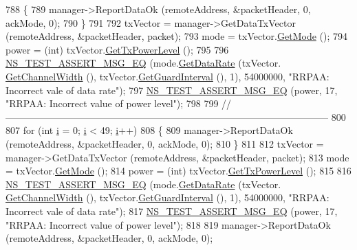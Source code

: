\begin{DoxyCode}
788     \{
789       manager->ReportDataOk (remoteAddress, &packetHeader, 0, ackMode, 0);
790     \}
791 
792   txVector = manager->GetDataTxVector (remoteAddress, &packetHeader, packet);
793   mode = txVector.\hyperlink{classns3_1_1WifiTxVector_a497b1f11cad4b8b26251dfa07c9ad1d6}{GetMode} ();
794   power = (int) txVector.\hyperlink{classns3_1_1WifiTxVector_a7c98bd9609ff1c5cefa6e22d6908a2fe}{GetTxPowerLevel} ();
795 
796   \hyperlink{group__testing_ga2a9d78cffb3db8e867c35fff0b698cf5}{NS\_TEST\_ASSERT\_MSG\_EQ} (mode.\hyperlink{classns3_1_1WifiMode_adcfbe150f69da720db23387f733b8a52}{GetDataRate} (txVector.
      \hyperlink{classns3_1_1WifiTxVector_a1f8bfa51778a3e217581eb665f059564}{GetChannelWidth} (), txVector.\hyperlink{classns3_1_1WifiTxVector_ab80c0fd812542ef337a6cace4f64db63}{GetGuardInterval} (), 1), 54000000, \textcolor{stringliteral}{"RRPAA:
       Incorrect vale of data rate"});
797   \hyperlink{group__testing_ga2a9d78cffb3db8e867c35fff0b698cf5}{NS\_TEST\_ASSERT\_MSG\_EQ} (power, 17, \textcolor{stringliteral}{"RRPAA: Incorrect value of power level"});
798 
799   \textcolor{comment}{//-----------------------------------------------------------------------------------------------------}
800 
807   \textcolor{keywordflow}{for} (\textcolor{keywordtype}{int} \hyperlink{bernuolliDistribution_8m_a6f6ccfcf58b31cb6412107d9d5281426}{i} = 0; \hyperlink{bernuolliDistribution_8m_a6f6ccfcf58b31cb6412107d9d5281426}{i} < 49; \hyperlink{bernuolliDistribution_8m_a6f6ccfcf58b31cb6412107d9d5281426}{i}++)
808     \{
809       manager->ReportDataOk (remoteAddress, &packetHeader, 0, ackMode, 0);
810     \}
811 
812   txVector = manager->GetDataTxVector (remoteAddress, &packetHeader, packet);
813   mode = txVector.\hyperlink{classns3_1_1WifiTxVector_a497b1f11cad4b8b26251dfa07c9ad1d6}{GetMode} ();
814   power = (int) txVector.\hyperlink{classns3_1_1WifiTxVector_a7c98bd9609ff1c5cefa6e22d6908a2fe}{GetTxPowerLevel} ();
815 
816   \hyperlink{group__testing_ga2a9d78cffb3db8e867c35fff0b698cf5}{NS\_TEST\_ASSERT\_MSG\_EQ} (mode.\hyperlink{classns3_1_1WifiMode_adcfbe150f69da720db23387f733b8a52}{GetDataRate} (txVector.
      \hyperlink{classns3_1_1WifiTxVector_a1f8bfa51778a3e217581eb665f059564}{GetChannelWidth} (), txVector.\hyperlink{classns3_1_1WifiTxVector_ab80c0fd812542ef337a6cace4f64db63}{GetGuardInterval} (), 1), 54000000, \textcolor{stringliteral}{"RRPAA:
       Incorrect vale of data rate"});
817   \hyperlink{group__testing_ga2a9d78cffb3db8e867c35fff0b698cf5}{NS\_TEST\_ASSERT\_MSG\_EQ} (power, 17, \textcolor{stringliteral}{"RRPAA: Incorrect value of power level"});
818 
819   manager->ReportDataOk (remoteAddress, &packetHeader, 0, ackMode, 0);

\end{DoxyCode}
